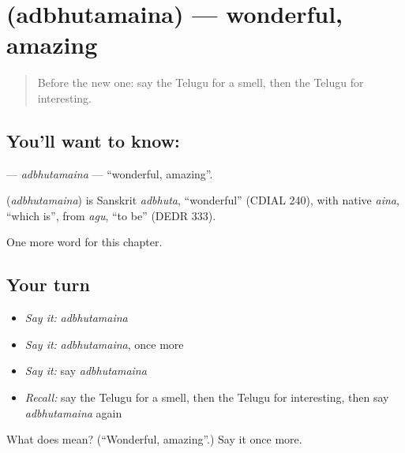 \section[\texorpdfstring{\te{అద్భుతమైన} (adbhutamaina)}{అద్భుతమైన (adbhutamaina)}]{ (adbhutamaina) — wonderful, amazing}

\label{lesson:TE-C181-adbhutamaina}



\begin{quote}
Before the new one: say the Telugu for a smell, then the Telugu for interesting.
\end{quote}

\subsection*{You'll want to know: }
\textbf{} — \emph{adbhutamaina} — \textquotedblleft{}wonderful, amazing\textquotedblright{}.

\begin{cousinweb}
\textbf{} (\emph{adbhutamaina}) is Sanskrit \emph{adbhuta}, \textquotedblleft{}wonderful\textquotedblright{} (CDIAL 240), with native \emph{aina}, \textquotedblleft{}which is\textquotedblright{}, from \emph{agu}, \textquotedblleft{}to be\textquotedblright{} (DEDR 333).
\end{cousinweb}

\begin{grammarlens}[title={What you've built}]
One more word for this chapter.
\end{grammarlens}

\subsection*{Your turn}
\begin{itemize}
\raggedright
  \item \emph{Say it:} \emph{adbhutamaina}
  \item \emph{Say it:} \emph{adbhutamaina}, once more
  \item \emph{Say it:} say \emph{adbhutamaina}
  \item \emph{Recall:} say the Telugu for a smell, then the Telugu for interesting, then say \emph{adbhutamaina} again
\end{itemize}

\begin{tcolorbox}[breakable,colback=teal!4,colframe=teal!35!black,title={Before you move on}]
What does  mean? (\textquotedblleft{}Wonderful, amazing\textquotedblright{}.) Say it once more.
\end{tcolorbox}
